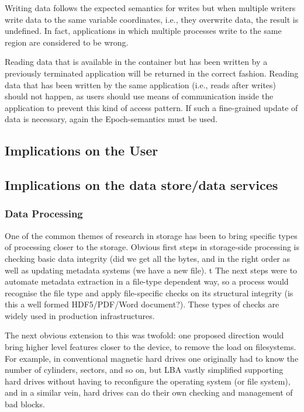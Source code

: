 Writing data follows the expected semantics for writes but when multiple writers write data to the same variable coordinates, i.e., they overwrite data, the result is undefined.
In fact, applications in which multiple processes write to the same region are considered to be wrong.

Reading data that is available in the container but has been written by a previously terminated application will be returned in the correct fashion.
Reading data that has been written by the same application (i.e., reads after writes) should not happen, as users should use means of communication inside the application to prevent this kind of access pattern.
If such a fine-grained update of data is necessary, again the Epoch-semantics must be used.




\subsection{Implications on the User}



\subsection{Implications on the data store/data services}

\subsubsection{Data Processing}

One of the common themes of research in storage has been to bring specific types
of processing closer to the storage. Obvious first steps in storage-side
processing is checking basic data integrity (did we get all the bytes, and in
the right order as well as updating metadata systems (we have a new file).
t The next steps were to automate metadata extraction in a file-type
dependent way, so a process would recognise the file type and apply
file-specific checks on its structural integrity (is this a well formed
HDF5/PDF/Word document?).  These types of checks are widely used in production
infrastructures.

The next obvious extension to this was twofold: one proposed direction would
bring higher level features closer to the device, to remove the load on
filesystems.  For example, in conventional magnetic hard drives one originally
had to know the number of cylinders, sectors, and so on, but LBA vastly
simplified supporting hard drives without having to reconfigure the operating
system (or file system), and in a similar vein, hard drives can do their own
checking and management of bad blocks.

